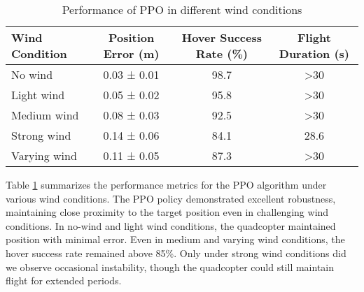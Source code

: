 \documentclass[12pt]{article}
\begin{document}
\begin{table}[htbp]
\centering
\caption{Performance of PPO in different wind conditions}
\begin{tabular}{lccc}
\toprule
Wind Condition & Position Error (m) & Hover Success Rate (\%) & Flight Duration (s) \\
\midrule
No wind & 0.03 ± 0.01 & 98.7 & >30 \\
Light wind & 0.05 ± 0.02 & 95.8 & >30 \\
Medium wind & 0.08 ± 0.03 & 92.5 & >30 \\
Strong wind & 0.14 ± 0.06 & 84.1 & 28.6 \\
Varying wind & 0.11 ± 0.05 & 87.3 & >30 \\
\bottomrule
\end{tabular}
\label{tab:wind_performance}
\end{table}


Table \ref{tab:wind_performance} summarizes the performance metrics for the PPO algorithm under various wind conditions. The PPO policy demonstrated excellent robustness, maintaining close proximity to the target position even in challenging wind conditions. In no-wind and light wind conditions, the quadcopter maintained position with minimal error. Even in medium and varying wind conditions, the hover success rate remained above 85\%. Only under strong wind conditions did we observe occasional instability, though the quadcopter could still maintain flight for extended periods.

\end{document}
